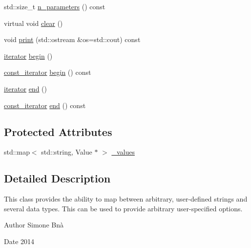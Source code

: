 \begin{DoxyCompactItemize}
\item 
std\+::size\+\_\+t \mbox{\hyperlink{classfemus_1_1_parameters_a78c60e3056c0f0d6954b4666a95aea25}{n\+\_\+parameters}} () const
\item 
virtual void \mbox{\hyperlink{classfemus_1_1_parameters_a95450c7428fcb8db6b4ce2ff2945a317}{clear}} ()
\item 
void \mbox{\hyperlink{classfemus_1_1_parameters_ad588c9af94c63cc1198bed69ec0d06f9}{print}} (std\+::ostream \&os=std\+::cout) const
\item 
\mbox{\hyperlink{classfemus_1_1_parameters_a2cbdfdaaa2d9438d9a6900aa62c8295b}{iterator}} \mbox{\hyperlink{classfemus_1_1_parameters_a360c1cf34dad7c0cd6a80b671d61e756}{begin}} ()
\item 
\mbox{\hyperlink{classfemus_1_1_parameters_aa561fb692a63fe58dcec20374e9569c2}{const\+\_\+iterator}} \mbox{\hyperlink{classfemus_1_1_parameters_abf591336eec6184e712ad320506c54a0}{begin}} () const
\item 
\mbox{\hyperlink{classfemus_1_1_parameters_a2cbdfdaaa2d9438d9a6900aa62c8295b}{iterator}} \mbox{\hyperlink{classfemus_1_1_parameters_a7c104ff6b7ed478cbf4fa02573baa93d}{end}} ()
\item 
\mbox{\hyperlink{classfemus_1_1_parameters_aa561fb692a63fe58dcec20374e9569c2}{const\+\_\+iterator}} \mbox{\hyperlink{classfemus_1_1_parameters_a73fed9732419624c19026581ecf45f0d}{end}} () const
\end{DoxyCompactItemize}
\subsection*{Protected Attributes}
\begin{DoxyCompactItemize}
\item 
std\+::map$<$ std\+::string, Value $\ast$ $>$ \mbox{\hyperlink{classfemus_1_1_parameters_a7cc0257d01c656db4d75122247e2dbf5}{\+\_\+values}}
\end{DoxyCompactItemize}


\subsection{Detailed Description}
This class provides the ability to map between arbitrary, user-\/defined strings and several data types. This can be used to provide arbitrary user-\/specified options.

\begin{DoxyAuthor}{Author}
Simone Bnà 
\end{DoxyAuthor}
\begin{DoxyDate}{Date}
2014 
\end{DoxyDate}


